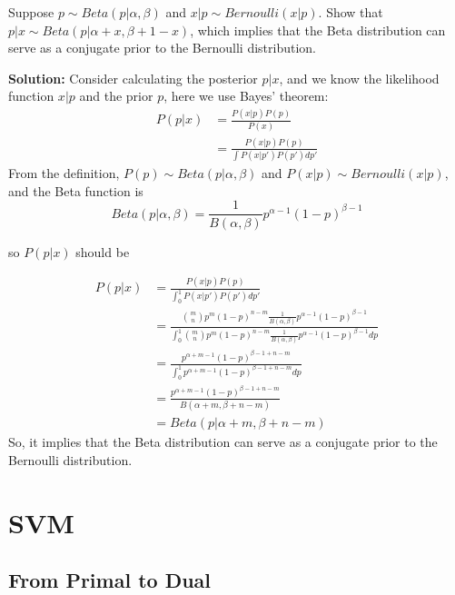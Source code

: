 \documentclass[a4paper]{article}
\begin{document}
Suppose $p \sim Beta(p|\alpha, \beta)$ and $x|p \sim Bernoulli(x|p)$. Show that $p|x \sim Beta(p|\alpha + x, \beta + 1 - x)$, which implies that the Beta distribution can serve as a conjugate prior to the Bernoulli distribution.

\textbf{Solution:} Consider calculating the posterior $p|x$, and we know the likelihood function $x|p$ and the prior $p$, here we use Bayes' theorem:
\begin{equation}
    \begin{aligned}
        P(p | x) &= \frac{P(x|p) P(p)}{P(x)} \\
                 &= \frac{P(x|p) P(p)}{\int P(x|p') P(p') dp'} 
    \end{aligned}
\end{equation}
From the definition, $P(p) \sim Beta(p|\alpha, \beta)$ and $P(x|p) \sim Bernoulli(x|p)$, and the Beta function is 
\begin{equation}
    Beta(p|\alpha, \beta) = \frac{1}{B(\alpha, \beta)} p^{\alpha - 1} (1-p)^{\beta-1}
\end{equation}

so $P(p | x)$ should be 

\begin{equation}
    \begin{aligned}
        P(p | x) &= \frac{P(x|p) P(p)}{\int_{0}^{1} P(x|p') P(p') dp'}\\
                 &= \frac{ \binom{m}{n}  p^{m} (1-p)^{n-m} \frac{1}{B(\alpha, \beta)} p^{\alpha - 1} (1-p)^{\beta-1}}{\int_{0}^{1} \binom{m}{n}  p^{m} (1-p)^{n-m} \frac{1}{B(\alpha, \beta)} p^{\alpha - 1} (1-p)^{\beta-1} dp}\\
                 &= \frac{  p^{\alpha + m - 1} (1-p)^{\beta-1+n-m}}{\int_{0}^{1} p^{\alpha +m - 1} (1-p)^{\beta-1+n-m} dp}\\
                 &=  \frac{  p^{\alpha + m - 1} (1-p)^{\beta-1+n-m}}{B(\alpha + m, \beta+n-m )}\\
                 &= Beta(p|\alpha + m, \beta+n-m)
    \end{aligned}
\end{equation}
So, it implies that the Beta distribution can serve as a conjugate prior to the Bernoulli distribution.



\section{SVM}


\subsection{From Primal to Dual}
\end{document}

